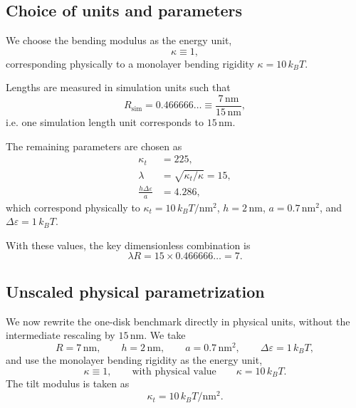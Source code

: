 \documentclass[11pt]{article}
\begin{document}
\subsection{Choice of units and parameters}

We choose the bending modulus as the energy unit,
\begin{equation}
\kappa \equiv 1 ,
\end{equation}
corresponding physically to a monolayer bending rigidity
\(\kappa = 10\,k_B T\).

Lengths are measured in simulation units such that
\begin{equation}
R_{\mathrm{sim}} = 0.466666\ldots \equiv \frac{7\,\mathrm{nm}}{15\,\mathrm{nm}},
\end{equation}
i.e. one simulation length unit corresponds to \(15\,\mathrm{nm}\).

The remaining parameters are chosen as
\begin{align}
\kappa_t &= 225 , \\
\lambda &= \sqrt{\kappa_t / \kappa} = 15 , \\
\frac{h \Delta \varepsilon}{a} &= 4.286 ,
\end{align}
which correspond physically to
\(\kappa_t = 10\,k_B T/\mathrm{nm}^2\),
\(h = 2\,\mathrm{nm}\),
\(a = 0.7\,\mathrm{nm}^2\),
and \(\Delta\varepsilon = 1\,k_B T\).

With these values, the key dimensionless combination is
\begin{equation}
\lambda R = 15 \times 0.466666\ldots = 7 .
\end{equation}

\subsection{Unscaled physical parametrization}

We now rewrite the one-disk benchmark directly in physical units, without the
intermediate rescaling by $15\,\mathrm{nm}$. We take
\begin{equation}
R = 7\,\mathrm{nm}, \qquad
h = 2\,\mathrm{nm}, \qquad
a = 0.7\,\mathrm{nm}^2, \qquad
\Delta\varepsilon = 1\,k_B T,
\label{eq:phys_params}
\end{equation}
and use the monolayer bending rigidity as the energy unit,
\begin{equation}
\kappa \equiv 1,
\qquad \text{with physical value} \qquad
\kappa = 10\,k_B T.
\label{eq:kappa_unit_unscaled}
\end{equation}
The tilt modulus is taken as
\begin{equation}
\kappa_t = 10\,k_B T/\mathrm{nm}^2.
\label{eq:kappat_unscaled}
\end{equation}
\end{document}
